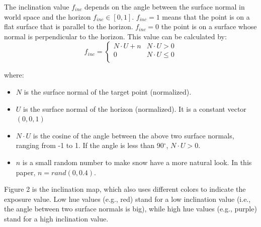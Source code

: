 \documentclass{article}
\begin{document}

The inclination value \( f_{inc} \) depends on the angle between the surface normal in world space and the horizon 
\( f_{inc} \in [0, 1] \). \( f_{inc}=1 \) means that the point is on a flat surface that is parallel to the horizon. 
\( f_{inc}=0 \) the point is on a surface whose normal is perpendicular to the horizon. This value can be calculated by:
\[
  f_{inc}=
  \left\{
    \begin{array}{ll}
      N \cdot U + n & N \cdot U > 0 \\
      0 & N \cdot U \leq 0 \\
    \end{array} 
  \right. 
\]

where:
\begin{itemize}
  \item \( N \) is the surface normal of the target point (normalized).
  \item \( U \) is the surface normal of the horizon (normalized). It is a constant vector \((0, 0, 1)\)
  \item \( N \cdot U \) is the cosine of the angle between the above two surface normals, ranging from -1 to 1. If the angle is less 
  than 90$^{\circ}$, \( N \cdot U > 0\).
  \item \( n \) is a small random number to make snow have a more natural look. In this paper, \(n = rand(0, 0.4)\).
\end{itemize}

Figure 2 is the inclination map, which also uses different colors to indicate the exposure value. Low hue values (e.g., red) stand for 
a low inclination value (i.e., the angle between two surface normals is big), while high hue values (e.g., purple) stand for a high 
inclination value.
\end{document}
